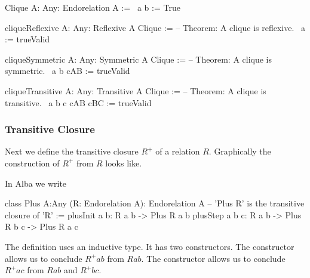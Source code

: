 \begin{alba}
    Clique {A: Any}: Endorelation A :=
        \ a b := True

    cliqueReflexive {A: Any}: Reflexive {A} Clique :=
        -- Theorem: A clique is reflexive.
        \ {a} := trueValid

    cliqueSymmetric {A: Any}: Symmetric {A} Clique :=
        -- Theorem: A clique is symmetric.
        \ {a b} cAB := trueValid

    cliqueTransitive {A: Any}: Transitive {A} Clique :=
        -- Theorem: A clique is transitive.
        \ {a b c} cAB cBC := trueValid
\end{alba}


\subsubsection{Transitive Closure}

Next we define the transitive closure $R^+$ of a relation $R$. Graphically the
construction of $R^+$ from $R$ looks like.



In Alba we write

\begin{alba}
    class
        Plus {A:Any} (R: Endorelation A): Endorelation A
            -- 'Plus R' is the transitive closure of 'R'
    :=
        plusInit {a b}:
            R a b -> Plus R a b
        plusStep {a b c}:
            R a b -> Plus R b c -> Plus R a c
\end{alba}

The definition uses an inductive type. It has two constructors. The
 constructor allows us to conclude $R^+ a b$ from $R a b$.  The
 constructor allows us to conclude $R^+ a c$ from $R a b$ and $R^+
b c$.

